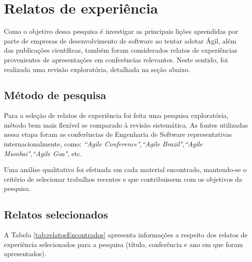 %
%

\section{Relatos de experiência}

Como o objetivo dessa pesquisa é investigar as principais lições aprendidas por parte de empresas de desenvolvimento de software ao tentar adotar Ágil, além das publicações científicas, também foram considerados relatos de experiências provenientes de apresentações em conferências relevantes. Neste sentido, foi realizada uma revisão exploratória, detalhada na seção abaixo.

\subsection{Método de pesquisa}

Para a seleção de relatos de experiência foi feita uma pesquisa exploratória, método bem mais flexível se comparado à revisão sistemática. As fontes utilizadas nessa etapa foram as conferências de Engenharia de Software representativas internacionalmente, como: \textit{``Agile Conference",``Agile Brazil",``Agile Mumbai",``Agile Goa"}, etc.

Uma análise qualitativa foi efetuada em cada material encontrado, mantendo-se o critério de selecionar trabalhos recentes e que contribuissem com os objetivos da pesquisa.

\subsection{Relatos selecionados}

A Tabela \ref{tab:relatosEncontrados} apresenta informações a respeito dos relatos de experiência selecionados para a pesquisa (título, conferência e ano em que foram apresentados).

